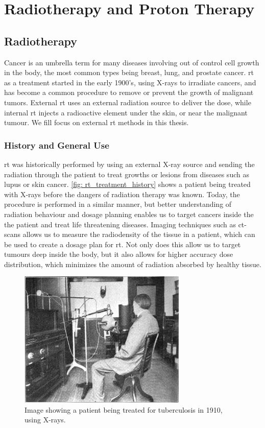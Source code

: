 \documentclass[main.tex]{subfiles}
\begin{document}
\section{Radiotherapy and Proton Therapy}

\subsection{Radiotherapy}

 Cancer is an umbrella term for many diseases involving out of control cell growth in the body, the most common types being breast, lung, and prostate cancer\cite{cancerData}. \gls{rt} as a treatment started in the early 1900's, using X-rays to irradiate cancers, and has become a common procedure to remove or prevent the growth of malignant tumors. External \gls{rt} uses an external radiation source to deliver the dose, while internal \gls{rt} injects a radioactive element under the skin, or near the malignant tumour. We fill focus on external \gls{rt} methods in this thesis.
 
 \subsubsection{History and General Use}
 
 \gls{rt} was historically performed by using an external X-ray source and sending the radiation through the patient to treat growths or lesions from diseases such as lupus or skin cancer. \autoref{fig: rt_treatment_history} shows a patient being treated with X-rays before the dangers of radiation therapy was known. Today, the procedure is performed in a similar manner, but better understanding of radiation behaviour and dosage planning enables us to target cancers inside the the patient and treat life threatening diseases. Imaging techniques such as \gls{ct}-scans allows us to measure the radiodensity of the tissue in a patient, which can be used to create a dosage plan for \gls{rt}. Not only does this allow us to target tumours deep inside the body, but it also allows for higher accuracy dose distribution, which minimizes the amount of radiation absorbed by healthy tissue.
 
  \begin{figure}[!htpb]
    \centering
    \includegraphics[width=8cm ]{images/x_ray_treatment_history.jpg}
    \caption{Image showing a patient being treated for tuberculosis in 1910, using X-rays.\cite{rt_history}}
    \label{fig: rt_treatment_history}
\end{figure}
 
\end{document}
